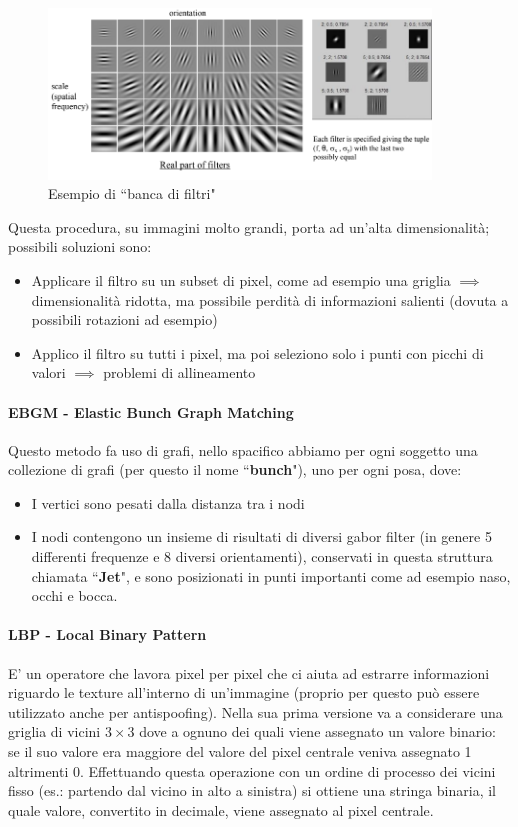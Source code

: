 \documentclass{article}
\begin{document}
\begin{figure}[H]
    \centering
    \includegraphics[width=4in]{imgs/gabor filter.PNG}
    \caption{Esempio di ``banca di filtri"}
    \label{fig:gaborFilters}
\end{figure}

Questa procedura, su immagini molto grandi, porta ad un'alta dimensionalità; possibili soluzioni sono:
\begin{itemize}
    \item Applicare il filtro su un subset di pixel, come ad esempio una griglia $\implies$ dimensionalità ridotta, ma possibile perdità di informazioni salienti (dovuta a possibili rotazioni ad esempio)
    \item Applico il filtro su tutti i pixel, ma poi seleziono solo i punti con picchi di valori $\implies$ problemi di allineamento
\end{itemize}

\paragraph{EBGM - Elastic Bunch Graph Matching}
Questo metodo fa uso di grafi, nello spacifico abbiamo per ogni soggetto una collezione di grafi (per questo il nome ``\textbf{bunch}"), uno per ogni posa, dove:
\begin{itemize}
    \item I vertici sono pesati dalla distanza tra i nodi
    \item I nodi contengono un insieme di risultati di diversi gabor filter (in genere 5 differenti frequenze e 8 diversi orientamenti), conservati in questa struttura chiamata ``\textbf{Jet}", e sono posizionati in punti importanti come ad esempio naso, occhi e bocca. 
\end{itemize}

\paragraph{LBP - Local Binary Pattern}
E' un operatore che lavora pixel per pixel che ci aiuta ad estrarre informazioni riguardo le texture all'interno di un'immagine (proprio per questo può essere utilizzato anche per antispoofing). Nella sua prima versione va a considerare una griglia di vicini $3\times 3$ dove a ognuno dei quali viene assegnato un valore binario: se il suo valore era maggiore del valore del pixel centrale veniva assegnato 1 altrimenti 0. Effettuando questa operazione con un ordine di processo dei vicini fisso (es.: partendo dal vicino in alto a sinistra) si ottiene una stringa binaria, il quale valore, convertito in decimale, viene assegnato al pixel centrale.
\end{document}
